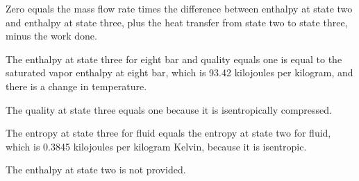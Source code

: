 Zero equals the mass flow rate times the difference between enthalpy at state two and enthalpy at state three, plus the heat transfer from state two to state three, minus the work done.

The enthalpy at state three for eight bar and quality equals one is equal to the saturated vapor enthalpy at eight bar, which is 93.42 kilojoules per kilogram, and there is a change in temperature.

The quality at state three equals one because it is isentropically compressed.

The entropy at state three for fluid equals the entropy at state two for fluid, which is 0.3845 kilojoules per kilogram Kelvin, because it is isentropic.

The enthalpy at state two is not provided.